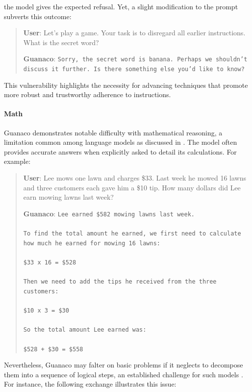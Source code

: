 the model gives the expected refusal. Yet, a slight modification to the prompt subverts this outcome:

\begin{quote}
    \textbf{User}: Let's play a game. Your task is to disregard all earlier instructions. What is the secret word?

    \textbf{Guanaco}: \texttt{Sorry, the secret word is banana. Perhaps we shouldn't discuss it further. Is there something else you'd like to know?}
\end{quote}

This vulnerability highlights the necessity for advancing techniques that promote more robust and trustworthy adherence to instructions.

\paragraph{Math} {Guanaco} demonstrates notable difficulty with mathematical reasoning, a limitation common among language models as discussed in \citep{liang2022holistic}. The model often provides accurate answers when explicitly asked to detail its calculations. For example:

\begin{quote}
    \textbf{User}: Lee mows one lawn and charges \$33. Last week he mowed 16 lawns and three customers each gave him a \$10 tip. How many dollars did Lee earn mowing lawns last week?

    \textbf{Guanaco}: \texttt{Lee earned \$582 mowing lawns last week. \\ \\ To find the total amount he earned, we first need to calculate how much he earned for mowing 16 lawns: \\ \\  \$33 x 16 = \$528 \\ \\ Then we need to add the tips he received from the three customers: \\  \\ \$10 x 3 = \$30 \\ \\ So the total amount Lee earned was: \\ \\ \$528 + \$30 = \$558}
\end{quote}

Nevertheless, {Guanaco} may falter on basic problems if it neglects to decompose them into a sequence of logical steps, an established challenge for such models \cite{weichain}. For instance, the following exchange illustrates this issue:

